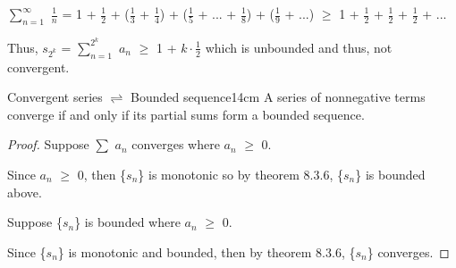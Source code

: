     \begin{tbox}
        $\sum_{n=1}^{\infty}$ $\frac{1}{n}$
        = 1 + $\frac{1}{2}$ + ($\frac{1}{3}$ + $\frac{1}{4}$)
        + ($\frac{1}{5}$ + ... + $\frac{1}{8}$) + ($\frac{1}{9}$ + ...)
        $\geq$ 1 + $\frac{1}{2}$ + $\frac{1}{2}$ + $\frac{1}{2}$ + ...

        Thus, $s_{2^k}$ = $\sum_{n=1}^{2^k}$ $a_n$
        $\geq$ 1 + $k \cdot \frac{1}{2}$
        which is unbounded and thus, not convergent.
    \end{tbox}
    
    \vspace{0.5cm}



    \begin{wtheorem}{Convergent series $\rightleftharpoons$ Bounded sequence}{14cm}
        A series of nonnegative terms converge if and only if
        its partial sums form a bounded sequence.
    \end{wtheorem}

    \begin{proof}
        Suppose $\sum$ $a_n$ converges where $a_n$ $\geq$ 0.

        Since $a_n$ $\geq$ 0, then \{$s_n$\} is monotonic so
        by {\color{red} theorem 8.3.6}, \{$s_n$\} is bounded above.

        \vspace{0.2cm}

        Suppose \{$s_n$\} is bounded where $a_n$ $\geq$ 0.

        Since \{$s_n$\} is monotonic and bounded, then
        by {\color{red} theorem 8.3.6}, \{$s_n$\} converges.
    \end{proof}

    \newpage    



